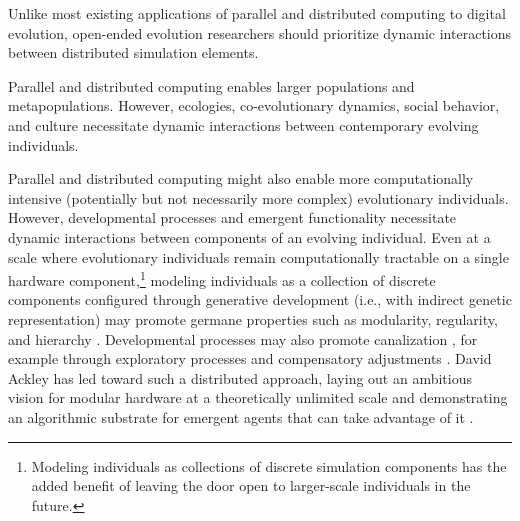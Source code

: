 

Unlike most existing applications of parallel and distributed computing to digital evolution, open-ended evolution researchers should prioritize dynamic interactions between distributed simulation elements.

Parallel and distributed computing enables larger populations and metapopulations.
However, ecologies, co-evolutionary dynamics, social behavior, and culture necessitate dynamic interactions between contemporary evolving individuals.

Parallel and distributed computing might also enable more computationally intensive (potentially but not necessarily more complex) evolutionary individuals.
However, developmental processes and emergent functionality necessitate dynamic interactions between components of an evolving individual. %
Even at a scale where evolutionary individuals remain computationally tractable on a single hardware component,\footnote{
Modeling individuals as collections of discrete simulation components has the added benefit of leaving the door open to larger-scale individuals in the future.
}
modeling individuals as a collection of discrete components configured through generative development (i.e., with indirect genetic representation) may promote germane properties \citep{lipson2007principles} such as modularity, regularity, and hierarchy \citep{hornby2005measuring, clune2011performance}.
Developmental processes may also promote canalization \citep{stanley2003taxonomy}, for example through exploratory processes and compensatory adjustments \citep{gerhart2007theory}.
David Ackley has led toward such a distributed approach, laying out an ambitious vision for modular hardware at a theoretically unlimited scale \citep{ackley2011pursue} and demonstrating an algorithmic substrate for emergent agents that can take advantage of it \citep{ackley2018digital}.

